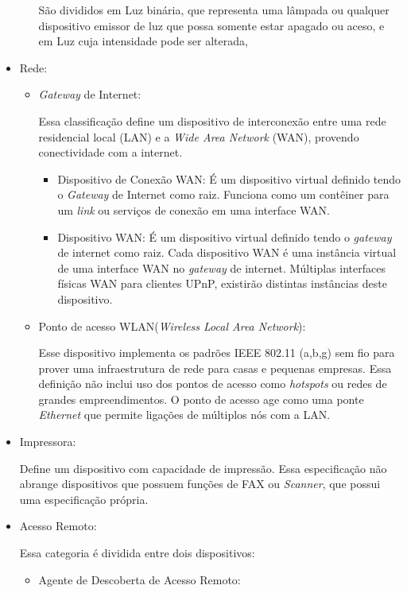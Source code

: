 \begin{itemize}
\begin{itemize}
			São divididos em Luz binária, que representa uma lâmpada ou qualquer dispositivo emissor de luz que possa somente estar apagado ou aceso, e em Luz cuja intensidade pode ser alterada, 
	\end{itemize}

\item Rede:
	\begin{itemize}
		\item \emph{Gateway} de Internet:
			
			Essa classificação define um dispositivo de interconexão entre uma rede residencial local (LAN) e a \emph{Wide Area Network} (WAN), provendo conectividade com a internet.
			\begin{itemize}
				\item Dispositivo de Conexão WAN: É um dispositivo virtual definido tendo o \emph{Gateway} de Internet como raiz. Funciona como um contêiner para um \emph{link} ou serviços de conexão em uma interface WAN. 
				\item Dispositivo WAN: É um dispositivo virtual definido tendo o \emph{gateway} de internet como raiz. Cada dispositivo WAN é uma instância virtual de uma interface WAN no \emph{gateway} de internet. Múltiplas interfaces físicas WAN para clientes UPnP, existirão distintas instâncias deste dispositivo.
			\end{itemize}

		\item Ponto de acesso WLAN(\emph{Wireless Local Area Network}):
			
			Esse dispositivo implementa os padrões IEEE 802.11 (a,b,g) sem fio para prover uma infraestrutura de rede para casas e pequenas empresas. Essa definição não inclui uso dos pontos de acesso como \emph{hotspots} ou redes de grandes empreendimentos. O ponto de acesso age como uma ponte \emph{Ethernet} que permite ligações de múltiplos nós com a LAN.
	\end{itemize}

\item Impressora:

	Define um dispositivo com capacidade de impressão. Essa especificação não abrange dispositivos que possuem funções de FAX ou \emph{Scanner}, que possui uma especificação própria.

\item Acesso Remoto:

	Essa categoria é dividida entre dois dispositivos:
	\begin{itemize}
		\item Agente de Descoberta de Acesso Remoto:


\end{itemize}
\end{itemize}
